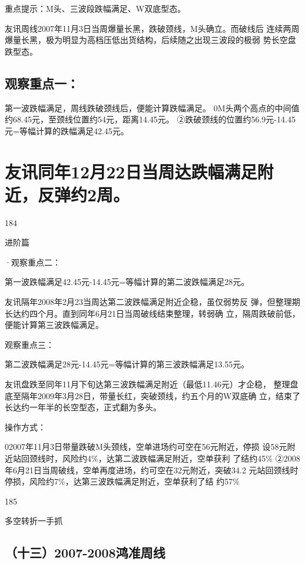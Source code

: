 \documentclass{article}
\begin{document}
重点提示：M头、三波段跌幅满足、W双底型态。

友讯周线2007年11月3日当周爆量长黑，跌破颈线，M头确立。而破线后 连续两周爆量长黑，极为明显为高档压低出货结构，后续随之出现三波段的极弱 势长空盘跌型态。

\subsection{观察重点一：}

第一波跌幅满足，周线跌破颈线后，便能计算跌幅满足。 0M头两个高点的中间值约68.45元，至颈线位置约54元，距离14.45元。 ②跌破颈线的位置约56.9元-14.45元=等幅计算的跌幅满足42.45元。

\section{友讯同年12月22日当周达跌幅满足附近，反弹约2周。}

184

\clearpage

进阶篇

·观察重点二：

第一波跌幅满足42.45元-14.45元=等幅计算的第二波跌幅满足28元。

友讯隔年2008年2月23当周达第二波跌幅满足附近企稳，虽仅弱势反 弹，但整理期长达约四个月。直到同年6月21日当周破线结束整理，转弱确 立，隔周跌破前低，便能计算第三波跌幅满足。

观察重点三：

第二波跌幅满足28元-14.45元=等幅计算的第三波跌幅满足13.55元。

友讯盘跌至同年11月下旬达第三波跌幅满足附近（最低11.46元）才企稳， 整理盘底至隔年2009年3月28日，带量长红，突破颈线，约五个月的W双底确 立，结束了长达约一年半的长空型态，正式翻为多头。

操作方式：

02007年11月3日带量跌破M头颈线，空单进场约可空在56元附近，停损 设58元附近站回颈线时，风险约4\%，达第二波跌幅满足附近，空单获利 了结约45\% ②2008年6月21日当周破线，空单再度进场，约可空在32元附近，突破34.2 元站回颈线时停损，风险约7\%，达第三波跌幅满足附近，空单获利了结 约57\%

185

\clearpage

多空转折一手抓

\subsection{（十三）2007-2008鸿准周线}
\end{document}

